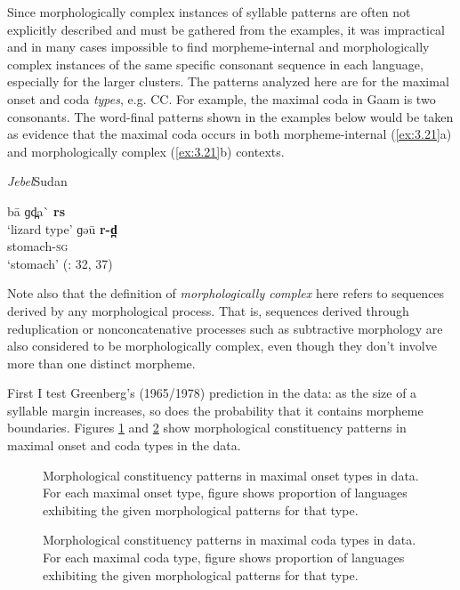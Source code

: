   Since morphologically complex instances of syllable patterns are often not explicitly described and must be gathered from the examples, it was impractical and in many cases impossible to find morpheme-internal and morphologically complex instances of the same specific consonant sequence in each language, especially for the larger clusters. The patterns analyzed here are for the maximal onset and coda \textit{types}, e.g. CC. For example, the maximal coda in Gaam is two consonants. The word-final patterns shown in the examples below would be taken as evidence that the maximal coda occurs in both morpheme-internal (\ref{ex:3.21}a) and morphologically complex (\ref{ex:3.21}b) contexts.

\ea\label{ex:3.21}
 \textit{Jebel}{Sudan}

\ea  ba\={} ɡd̪a\`{} \textbf{rs}\\
\glt ‘lizard type’
\ex  ɡəu\={} \textbf{r-d̪}\\
stomach-\textsc{sg}\\
\glt ‘stomach’
(\citealt{Stirtz2011}: 32, 37)
\z
\z

  Note also that the definition of \textit{morphologically complex} here refers to sequences derived by any morphological process. That is, sequences derived through reduplication or nonconcatenative processes such as subtractive morphology are also considered to be morphologically complex, even though they don’t involve more than one distinct morpheme.

  First I test Greenberg’s (1965/1978) prediction in the data: as the size of a syllable margin increases, so does the probability that it contains morpheme boundaries. Figures \ref{fig:3.3} and \ref{fig:3.4} show morphological constituency patterns in maximal onset and coda types in the data.

  
\begin{figure}
\caption{\label{fig:3.3} Morphological constituency patterns in maximal onset types in data. For each maximal onset type, figure shows proportion of languages exhibiting the given morphological patterns for that type.}
\end{figure}


\begin{figure}
\caption{\label{fig:3.4} Morphological constituency patterns in maximal coda types in data. For each maximal coda type, figure shows proportion of languages exhibiting the given morphological patterns for that type.}
\end{figure}


